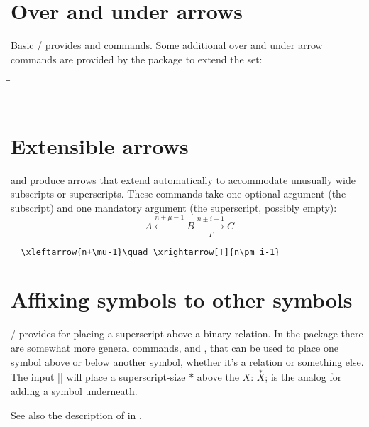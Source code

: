 \documentclass[leqno,titlepage,openany]{amsldoc}[1999/12/13]
\begin{document}
\section{Over and under arrows}

Basic \latex/ provides  and 
commands. Some additional over and under arrow commands are provided
by the  package to extend the set:

\begin{tabbing}
\qquad\=\qquad\=\kill
\>     \>  \+\\
       \>  \\
   \> 
\end{tabbing}

\section{Extensible arrows}

 and  produce
arrows that extend automatically to accommodate
unusually wide subscripts or superscripts. These commands take one
optional argument (the subscript) and one mandatory argument (the
superscript, possibly empty):
\begin{equation}
A\xleftarrow{n+\mu-1}B \xrightarrow[T]{n\pm i-1}C
\end{equation}
\begin{verbatim}
  \xleftarrow{n+\mu-1}\quad \xrightarrow[T]{n\pm i-1}
\end{verbatim}

\section{Affixing symbols to other symbols}

\latex/ provides  for placing a
superscript above a binary relation.
In the  package there are somewhat more general commands,
 and , that can be used to place one symbol
above or below another symbol, whether it's a relation or something
else. The input || will place a superscript-size $*$ above
the $X$: $\overset{*}{X}$;  is the analog for adding a
symbol underneath.

See also the description of  in .
\end{document}

